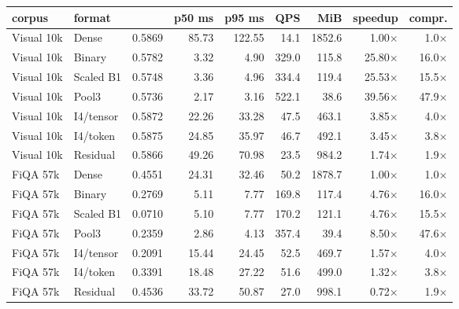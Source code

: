 \begin{tabular}{llrrrrrrr}
\toprule
corpus & format & \ndcg{} & p50 ms & p95 ms & QPS & MiB & speedup & compr. \\
\midrule
Visual 10k & Dense & 0.5869 & 85.73 & 122.55 & 14.1 & 1852.6 & 1.00$\times$ & 1.0$\times$ \\
Visual 10k & Binary & 0.5782 & 3.32 & 4.90 & 329.0 & 115.8 & 25.80$\times$ & 16.0$\times$ \\
Visual 10k & Scaled B1 & 0.5748 & 3.36 & 4.96 & 334.4 & 119.4 & 25.53$\times$ & 15.5$\times$ \\
Visual 10k & Pool3 & 0.5736 & 2.17 & 3.16 & 522.1 & 38.6 & 39.56$\times$ & 47.9$\times$ \\
Visual 10k & I4/tensor & 0.5872 & 22.26 & 33.28 & 47.5 & 463.1 & 3.85$\times$ & 4.0$\times$ \\
Visual 10k & I4/token & 0.5875 & 24.85 & 35.97 & 46.7 & 492.1 & 3.45$\times$ & 3.8$\times$ \\
Visual 10k & Residual & 0.5866 & 49.26 & 70.98 & 23.5 & 984.2 & 1.74$\times$ & 1.9$\times$ \\
FiQA 57k & Dense & 0.4551 & 24.31 & 32.46 & 50.2 & 1878.7 & 1.00$\times$ & 1.0$\times$ \\
FiQA 57k & Binary & 0.2769 & 5.11 & 7.77 & 169.8 & 117.4 & 4.76$\times$ & 16.0$\times$ \\
FiQA 57k & Scaled B1 & 0.0710 & 5.10 & 7.77 & 170.2 & 121.1 & 4.76$\times$ & 15.5$\times$ \\
FiQA 57k & Pool3 & 0.2359 & 2.86 & 4.13 & 357.4 & 39.4 & 8.50$\times$ & 47.6$\times$ \\
FiQA 57k & I4/tensor & 0.2091 & 15.44 & 24.45 & 52.5 & 469.7 & 1.57$\times$ & 4.0$\times$ \\
FiQA 57k & I4/token & 0.3391 & 18.48 & 27.22 & 51.6 & 499.0 & 1.32$\times$ & 3.8$\times$ \\
FiQA 57k & Residual & 0.4536 & 33.72 & 50.87 & 27.0 & 998.1 & 0.72$\times$ & 1.9$\times$ \\
\bottomrule
\end{tabular}
